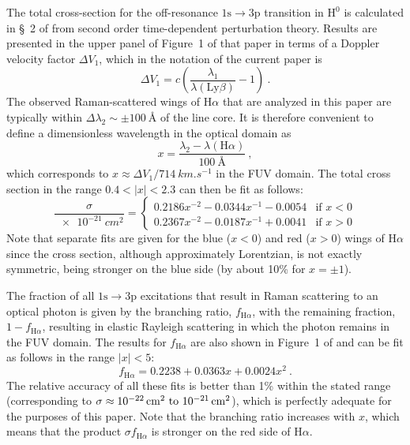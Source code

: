 \documentclass[useAMS, usenatbib, a4paper]{mnras}
\newcommand*\chem[1]{\ensuremath{\mathrm{#1}}}
\newcommand\Config[1]{\ensuremath{\mathrm{#1}}}
\newcommand\ha{\ensuremath{\text{H}\alpha}}
\newcommand\lyb{\ensuremath{\text{Ly}\beta}}
\begin{document}
The total cross-section for the off-resonance \Config{1s \to 3p}
transition in \chem{H^0} is calculated in \S~2 of \citet{Chang:2015a}
from second order time-dependent perturbation theory. Results are
presented in the upper panel of Figure~1 of that paper in terms of a
Doppler velocity factor \(\Delta V_1\), which in the notation of the
current paper is
\begin{equation}
  \label{eq:chang-DeltaV1}
  \Delta V_1 = c \left( \frac{\lambda_1}{\lambda(\lyb)} - 1 \right) \ .
\end{equation}
The observed Raman-scattered wings of \ha{} that are analyzed in this paper
are typically within \(\Delta\lambda_2 \sim \pm \SI{100}{\angstrom}\) of the line
core.  It is therefore convenient to define a dimensionless wavelength
in the optical domain as
\begin{equation}
  \label{eq:x-optical-def}
  x = \frac{\lambda_2 - \lambda(\ha)}{\SI{100}{\angstrom}} \ ,
\end{equation}
which corresponds to \(x \approx \Delta V_1 / \SI{714}{km.s^{-1}}\) in the FUV
domain.  The total cross section in the range \(0.4 < |x| < 2.3\) can
then be fit as follows:
\begin{equation}
  \label{eq:total-cross-section-fit}
  \frac{\sigma}{\SI{e-21}{cm^2}} =  
  \begin{cases}
    0.2186 x^{-2} - 0.0344 x^{-1} - 0.0054 & \text{if \(x < 0\)} \\
    0.2367 x^{-2} - 0.0187 x^{-1} + 0.0041 & \text{if \(x > 0\)} 
  \end{cases}
\end{equation}
Note that separate fits are given for the blue (\(x < 0\)) and red
(\(x > 0\)) wings of \ha{} since the cross section, although
approximately Lorentzian, is not exactly symmetric, being stronger on
the blue side (by about 10\% for \(x = \pm 1\)).

The fraction of all \Config{1s \to 3p} excitations that result in Raman
scattering to an optical photon is given by the branching ratio,
\(f_{\ha}\), with the remaining fraction, \(1 - f_{\ha}\), resulting
in elastic Rayleigh scattering in which the photon remains in the FUV
domain.  The results for \(f_{\ha}\) are also shown in Figure~1 of
\citet{Chang:2015a} and can be fit as follows in the range
\(|x| < 5\):
\begin{equation}
  \label{eq:fha-fit}
  f_{\ha} = 0.2238 + 0.0363 x + 0.0024 x^2 \ .
\end{equation}
The relative accuracy of all these fits is better than 1\% within the
stated range (corresponding to
\(\sigma \approx \text{\SIrange{e-22}{e-21}{cm^2}}\)), which is perfectly
adequate for the purposes of this paper.  Note that the branching
ratio increases with \(x\), which means that the product
\(\sigma f_{\ha} \) is stronger on the red side of \ha{}.
\end{document}
